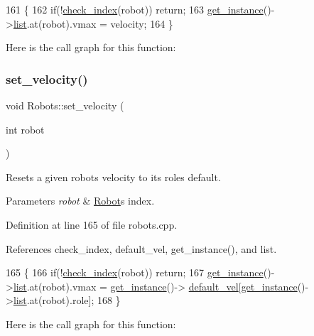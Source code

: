 \begin{DoxyCode}
161                                                    \{
162     \textcolor{keywordflow}{if}(!\hyperlink{robots_8hpp_ae3e6ae8f87cdc750c0b99bc609d9ae43}{check\_index}(robot)) \textcolor{keywordflow}{return};
163     \hyperlink{class_robots_a589bce74db5f34af384952d48435168f}{get\_instance}()->\hyperlink{class_robots_a2c6b77265028f82a4342ca1ef15ed305}{list}.at(robot).vmax = velocity;
164 \}
\end{DoxyCode}
Here is the call graph for this function\+:
\mbox{\label{class_robots_a89002b0b36b894c17652c91bc6c73d59}} 
\subsubsection{\texorpdfstring{set\+\_\+velocity()}{set\_velocity()}\hspace{0.1cm}{\footnotesize\ttfamily [3/3]}}
{\footnotesize\ttfamily void Robots\+::set\+\_\+velocity (\begin{DoxyParamCaption}\item[{int}]{robot }\end{DoxyParamCaption})\hspace{0.3cm}{\ttfamily [static]}}

Resets a given robot\textquotesingle{}s velocity to it\textquotesingle{}s role\textquotesingle{}s default. 
\begin{DoxyParams}{Parameters}
{\em robot} & \hyperlink{struct_robots_1_1_robot}{Robot}\textquotesingle{}s index. \\
\hline
\end{DoxyParams}


Definition at line 165 of file robots.\+cpp.



References check\+\_\+index, default\+\_\+vel, get\+\_\+instance(), and list.


\begin{DoxyCode}
165                                    \{
166     \textcolor{keywordflow}{if}(!\hyperlink{robots_8hpp_ae3e6ae8f87cdc750c0b99bc609d9ae43}{check\_index}(robot)) \textcolor{keywordflow}{return};
167     \hyperlink{class_robots_a589bce74db5f34af384952d48435168f}{get\_instance}()->\hyperlink{class_robots_a2c6b77265028f82a4342ca1ef15ed305}{list}.at(robot).vmax = \hyperlink{class_robots_a589bce74db5f34af384952d48435168f}{get\_instance}()->
      \hyperlink{class_robots_a6c03d49137645a67d5c5e39bb953a788}{default\_vel}[\hyperlink{class_robots_a589bce74db5f34af384952d48435168f}{get\_instance}()->\hyperlink{class_robots_a2c6b77265028f82a4342ca1ef15ed305}{list}.at(robot).role];
168 \}
\end{DoxyCode}
Here is the call graph for this function\+:
\mbox{\label{class_robots_a6bd2e21654da3f7c3acc380a2b838240}} 

